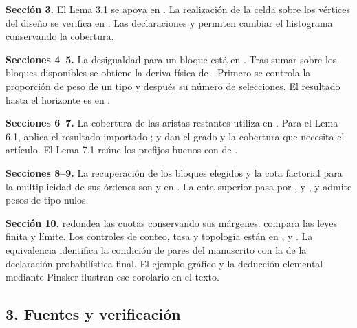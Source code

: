\documentclass[spanish,11pt,a4paper]{article}
\begin{document}
\textbf{Sección 3.} El Lema 3.1 se apoya en . La realización de la celda sobre los vértices del diseño se verifica en . Las declaraciones  y  permiten cambiar el histograma conservando la cobertura.

\textbf{Secciones 4--5.} La desigualdad para un bloque está en . Tras sumar sobre los bloques disponibles se obtiene la deriva física  de . Primero se controla la proporción de peso de un tipo y después su número de selecciones. El resultado hasta el horizonte es  en .

\textbf{Secciones 6--7.} La cobertura de las aristas restantes utiliza  en . Para el Lema 6.1,  aplica el resultado importado ;  y  dan el grado y la cobertura que necesita el artículo. El Lema 7.1 reúne los prefijos buenos con  de .

\textbf{Secciones 8--9.} La recuperación de los bloques elegidos y la cota factorial para la multiplicidad de sus órdenes son  y  en . La cota superior pasa por ,  y , y admite pesos de tipo nulos.

\textbf{Sección 10.}  redondea las cuotas conservando sus márgenes.  compara las leyes finita y límite. Los controles de conteo, tasa y topología están en ,  y . La equivalencia  identifica la condición de pares del manuscrito con la de la declaración probabilística final. El ejemplo gráfico y la deducción elemental mediante Pinsker ilustran ese corolario en el texto.

\subsection{3. Fuentes y verificación}\label{fuentes-y-verificaciuxf3n}
\end{document}

